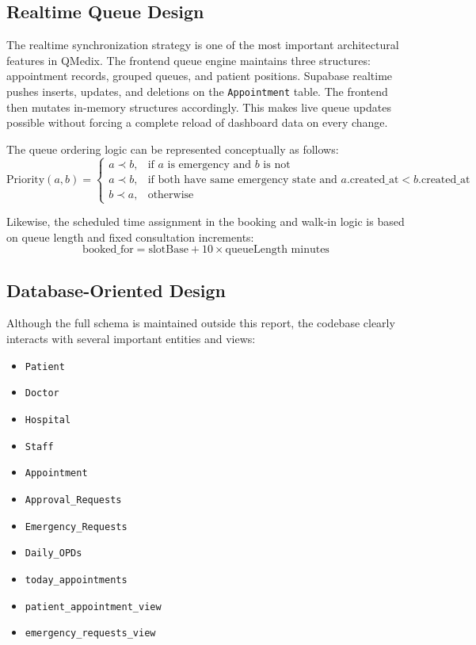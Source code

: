 \documentclass[12pt,onecolumn]{IEEEtran}
\begin{document}
\subsection{Realtime Queue Design}
The realtime synchronization strategy is one of the most important architectural features in QMedix. The frontend queue engine maintains three structures: appointment records, grouped queues, and patient positions. Supabase realtime pushes inserts, updates, and deletions on the \texttt{Appointment} table. The frontend then mutates in-memory structures accordingly. This makes live queue updates possible without forcing a complete reload of dashboard data on every change.

The queue ordering logic can be represented conceptually as follows:
\begin{equation}
\text{Priority}(a,b) =
\begin{cases}
a \prec b, & \text{if } a \text{ is emergency and } b \text{ is not}\\
a \prec b, & \text{if both have same emergency state and } a.\text{created\_at} < b.\text{created\_at}\\
b \prec a, & \text{otherwise}
\end{cases}
\end{equation}

Likewise, the scheduled time assignment in the booking and walk-in logic is based on queue length and fixed consultation increments:
\begin{equation}
\text{booked\_for} = \text{slotBase} + 10 \times \text{queueLength minutes}
\end{equation}

\subsection{Database-Oriented Design}
Although the full schema is maintained outside this report, the codebase clearly interacts with several important entities and views:
\begin{itemize}
    \item \texttt{Patient}
    \item \texttt{Doctor}
    \item \texttt{Hospital}
    \item \texttt{Staff}
    \item \texttt{Appointment}
    \item \texttt{Approval\_Requests}
    \item \texttt{Emergency\_Requests}
    \item \texttt{Daily\_OPDs}
    \item \texttt{today\_appointments}
    \item \texttt{patient\_appointment\_view}
    \item \texttt{emergency\_requests\_view}
\end{itemize}
\end{document}
